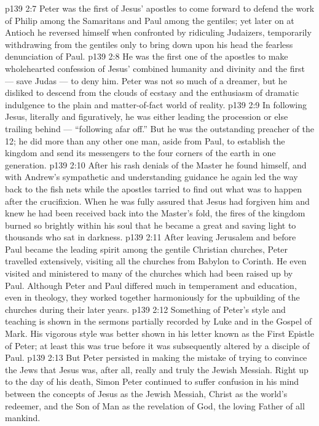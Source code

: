\vs p139 2:7 Peter was the first of Jesus’ apostles to come forward to defend the work of Philip among the Samaritans and Paul among the gentiles; yet later on at Antioch he reversed himself when confronted by ridiculing Judaizers, temporarily withdrawing from the gentiles only to bring down upon his head the fearless denunciation of Paul.
\vs p139 2:8 He was the first one of the apostles to make wholehearted confession of Jesus’ combined humanity and divinity and the first --- save Judas --- to deny him. Peter was not so much of a dreamer, but he disliked to descend from the clouds of ecstasy and the enthusiasm of dramatic indulgence to the plain and matter\hyp{}of\hyp{}fact world of reality.
\vs p139 2:9 In following Jesus, literally and figuratively, he was either leading the procession or else trailing behind --- “following afar off.” But he was the outstanding preacher of the 12; he did more than any other one man, aside from Paul, to establish the kingdom and send its messengers to the four corners of the earth in one generation.
\vs p139 2:10 After his rash denials of the Master he found himself, and with Andrew’s sympathetic and understanding guidance he again led the way back to the fish nets while the apostles tarried to find out what was to happen after the crucifixion. When he was fully assured that Jesus had forgiven him and knew he had been received back into the Master’s fold, the fires of the kingdom burned so brightly within his soul that he became a great and saving light to thousands who sat in darkness.
\vs p139 2:11 \pc After leaving Jerusalem and before Paul became the leading spirit among the gentile Christian churches, Peter travelled extensively, visiting all the churches from Babylon to Corinth. He even visited and ministered to many of the churches which had been raised up by Paul. Although Peter and Paul differed much in temperament and education, even in theology, they worked together harmoniously for the upbuilding of the churches during their later years.
\vs p139 2:12 \pc Something of Peter’s style and teaching is shown in the sermons partially recorded by Luke and in the Gospel of Mark. His vigorous style was better shown in his letter known as the First Epistle of Peter; at least this was true before it was subsequently altered by a disciple of Paul.
\vs p139 2:13 But Peter persisted in making the mistake of trying to convince the Jews that Jesus was, after all, really and truly the Jewish Messiah. Right up to the day of his death, Simon Peter continued to suffer confusion in his mind between the concepts of Jesus as the Jewish Messiah, Christ as the world’s redeemer, and the Son of Man as the revelation of God, the loving Father of all mankind.
